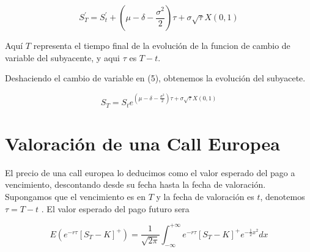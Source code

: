\documentclass[12pt]{article}
\begin{document}
\begin{equation}
	S_{T}^{'} = S_{t}^{'} + \left(\mu - \delta - \frac{\sigma^{2}}{2}\right) \tau + \sigma\sqrt{\tau}X(0,1)
\end{equation}

Aqu\'{i} $T$ representa el tiempo final de la evoluci\'{o}n de la funcion de cambio de variable del subyacente, y aqui $\tau$ es 
$T - t$.
\newline

Deshaciendo el cambio de variable en (5), obtenemos la evoluci\'{o}n del subyacete.
\newline

\begin{equation}
	S_{T}=S_{t}e^{\left( \mu - \delta - \frac{\sigma^{2}}{2} \right)\tau + \sigma\sqrt{\tau}X\left( 0,1\right)}
\end{equation}
\newpage

\section{Valoraci\'{o}n de una Call Europea}
El precio de una call europea lo deducimos como el valor esperado del pago a vencimiento, descontando desde su fecha hasta
la fecha de valoraci\'{o}n. Supongamos que el vencimiento es en $T$ y la fecha de valoraci\'{o}n es $t$, denotemos $\tau = T - t$ . 
El valor esperado del pago futuro sera

\begin{equation}
	E\left( e^{-r\tau} \left[ S_{T} - K \right] ^{+} \right) = \frac{1}{\sqrt{2\pi}} \int_{-\infty}^{+\infty}e^{-r\tau}
	\left[ S_{T} - K \right] ^{+} e^{-\frac{1}{2}x^{2}}dx
\end{equation}
\end{document}
